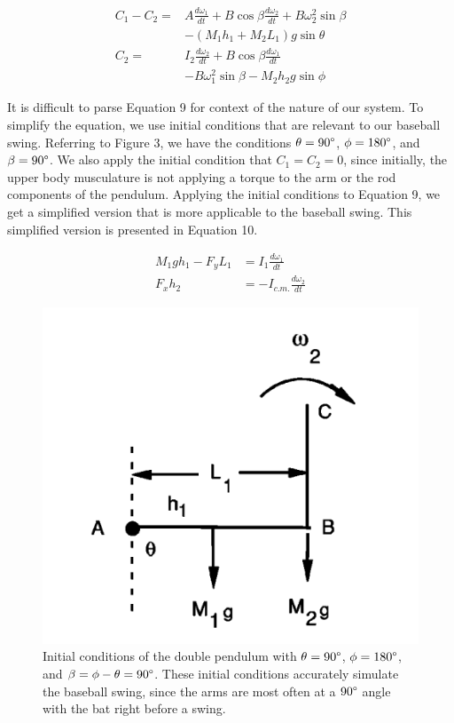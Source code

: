 \documentclass[%
 aip,
 amsmath,amssymb,
 reprint,%
 floatfix,%
]{revtex4-1}
\begin{document}
\begin{equation}
	\begin{aligned}
		C_1 - C_2 = & A \frac{d \omega_1}{dt} + B \cos{\beta} \frac{d \omega_2}{dt} + B \omega_2^2 \sin{\beta} \\
			    & -(M_1 h_1 + M_2 L_1) g \sin{\theta}\\
		C_2 = & I_2 \frac{d \omega_2}{dt} + B \cos{\beta} \frac{d \omega_1}{dt} \\
		      & -B \omega_1^2 \sin{\beta} -M_2 h_2 g \sin{\phi}
	\end{aligned}
\end{equation}


It is difficult to parse Equation 9 for context of the nature of our system. To simplify the equation, we use initial conditions that are relevant to our baseball swing. Referring to Figure 3, we have the conditions $\theta=90\degree$, $\phi=180\degree$, and $\beta=90\degree$. We also apply the initial condition that $C_1 = C_2 = 0$, since initially, the upper body musculature is not applying a torque to the arm or the rod components of the pendulum. Applying the initial conditions to Equation 9, we get a simplified version that is more applicable to the baseball swing. This simplified version is presented in Equation 10.

\begin{equation}
	\begin{aligned}
		M_1 g h_1 - F_y L_1  & = I_1 \frac{d\omega_1}{dt} \\
		F_x h_2 & = -I_{c.m.} \frac{d\omega_2}{dt}
	\end{aligned}
\end{equation}

\begin{figure}
	\centering
	\includegraphics[scale=0.5]{wristcock.png}
	\caption{Initial conditions of the double pendulum with $\theta=90\degree$, $\phi=180\degree$, and $\beta=\phi-\theta=90\degree$. These initial conditions accurately simulate the baseball swing, since the arms are most often at a $90\degree$ angle with the bat right before a swing.}
\end{figure}
\end{document}
